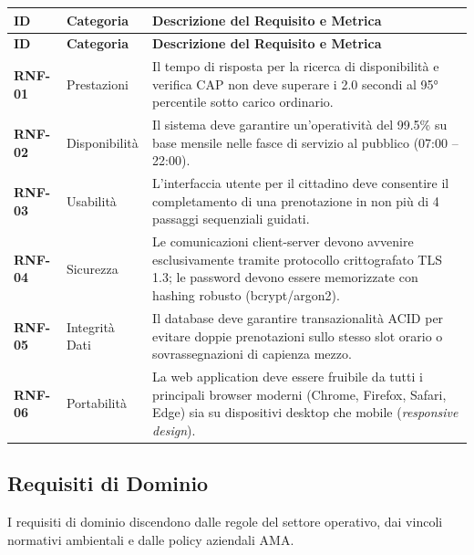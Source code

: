 \begin{center}
\renewcommand{\arraystretch}{1.3}
\begin{longtable}{|p{2.2cm}|p{3cm}|p{10cm}|}
\hline
\rowcolor{tableheader} \textbf{ID} & \textbf{Categoria} & \textbf{Descrizione del Requisito e Metrica} \\ \hline
\endfirsthead

\hline
\rowcolor{tableheader} \textbf{ID} & \textbf{Categoria} & \textbf{Descrizione del Requisito e Metrica} \\ \hline
\endhead

\textbf{RNF-01} & Prestazioni & Il tempo di risposta per la ricerca di disponibilità e verifica CAP non deve superare i 2.0 secondi al 95° percentile sotto carico ordinario. \\ \hline

\textbf{RNF-02} & Disponibilità & Il sistema deve garantire un'operatività del 99.5\% su base mensile nelle fasce di servizio al pubblico (07:00 -- 22:00). \\ \hline

\textbf{RNF-03} & Usabilità & L'interfaccia utente per il cittadino deve consentire il completamento di una prenotazione in non più di 4 passaggi sequenziali guidati. \\ \hline

\textbf{RNF-04} & Sicurezza & Le comunicazioni client-server devono avvenire esclusivamente tramite protocollo crittografato TLS 1.3; le password devono essere memorizzate con hashing robusto (bcrypt/argon2). \\ \hline

\textbf{RNF-05} & Integrità Dati & Il database deve garantire transazionalità ACID per evitare doppie prenotazioni sullo stesso slot orario o sovrassegnazioni di capienza mezzo. \\ \hline

\textbf{RNF-06} & Portabilità & La web application deve essere fruibile da tutti i principali browser moderni (Chrome, Firefox, Safari, Edge) sia su dispositivi desktop che mobile (\textit{responsive design}). \\ \hline
\end{longtable}
\end{center}

\subsection{Requisiti di Dominio}
I requisiti di dominio discendono dalle regole del settore operativo, dai vincoli normativi ambientali e dalle policy aziendali AMA.

